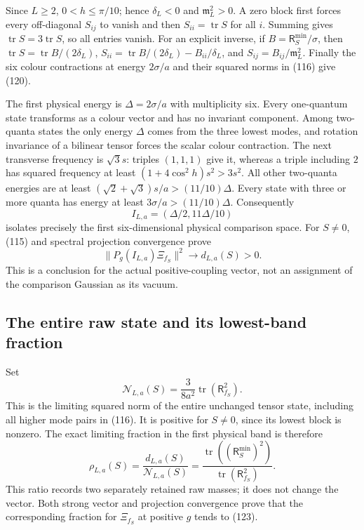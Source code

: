 \documentclass[11pt]{article}
\begin{document}
Since $L\ge2$, $0<h\le\pi/10$; hence $\delta_L<0$ and
$\mathfrak m_L^2>0$. A zero block first forces every off-diagonal
$S_{ij}$ to vanish and then $S_{ii}=\operatorname{tr}S$ for all $i$.
Summing gives $\operatorname{tr}S=3\operatorname{tr}S$, so all entries
vanish. For an explicit inverse, if $B=\mathsf R_S^{\min}/\sigma$,
then
$\operatorname{tr}S=\operatorname{tr}B/(2\delta_L)$,
$S_{ii}=\operatorname{tr}B/(2\delta_L)-B_{ii}/\delta_L$, and
$S_{ij}=B_{ij}/\mathfrak m_L^2$.
Finally the six colour contractions at energy $2\sigma/a$ and their
squared norms in (116) give (120).



The first physical energy is $\Delta=2\sigma/a$ with multiplicity six.
Every one-quantum state transforms as a colour vector and has no
invariant component. Among two-quanta states the only energy $\Delta$
comes from the three lowest modes, and rotation invariance of a
bilinear tensor forces the scalar colour contraction.
The next transverse frequency is $\sqrt3s$: triples $(1,1,1)$
give it, whereas a triple including $2$ has squared frequency at least
$(1+4\cos^2h)s^2>3s^2$.
All other two-quanta energies are at least
$(\sqrt2+\sqrt3)s/a>(11/10)\Delta$.
Every state with three or more quanta has energy at least
$3\sigma/a>(11/10)\Delta$.
Consequently
\[
 I_{L,a}=(\Delta/2,11\Delta/10)
\]
isolates precisely the first six-dimensional physical comparison space.
For $S\ne0$, (115) and spectral projection convergence
prove
\begin{equation}\label{eq:low-positive-g}
 \|P_g(I_{L,a})\Xi_{f_S}\|^2\longrightarrow d_{L,a}(S)>0.
\end{equation}
This is a conclusion for the actual positive-coupling vector, not
an assignment of the comparison Gaussian as its vacuum.

\subsection{The entire raw state and its lowest-band fraction}

Set
\[
 \mathcal N_{L,a}(S)=\frac3{8a^2}\operatorname{tr}(\mathsf R_{f_S}^2).
\]
This is the limiting squared norm of the entire unchanged tensor state,
including all higher mode pairs in (116).
It is positive for $S\ne0$, since its lowest block is nonzero.
The exact limiting fraction in the first physical band is therefore
\begin{equation}\label{eq:low-fraction}
 \rho_{L,a}(S)=
 \frac{d_{L,a}(S)}{\mathcal N_{L,a}(S)}
 =\frac{\operatorname{tr}((\mathsf R_S^{\min})^2)}
        {\operatorname{tr}(\mathsf R_{f_S}^2)}.
\end{equation}
This ratio records two separately retained raw masses; it does not
change the vector. Both strong vector and projection convergence prove
that the corresponding fraction for $\Xi_{f_S}$ at positive $g$
tends to (123).
\end{document}
